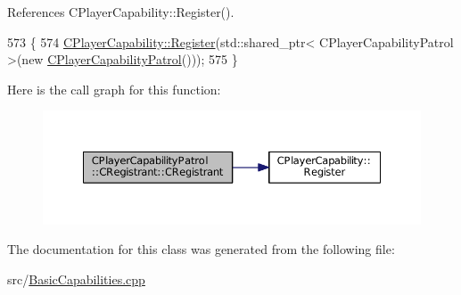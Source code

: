 References C\+Player\+Capability\+::\+Register().


\begin{DoxyCode}
573                                                \{
574     \hyperlink{classCPlayerCapability_a7e298018dcde2684451add3cfff065f7}{CPlayerCapability::Register}(std::shared\_ptr< CPlayerCapabilityPatrol >(\textcolor{keyword}{new} 
      \hyperlink{classCPlayerCapabilityPatrol_a9c8653e6b0509a753d0b084f3988953b}{CPlayerCapabilityPatrol}()));   
575 \}
\end{DoxyCode}
Here is the call graph for this function\+:\nopagebreak
\begin{figure}[H]
\begin{center}
\leavevmode
\includegraphics[width=350pt]{classCPlayerCapabilityPatrol_1_1CRegistrant_a30363f71e5aeed45f3953729b07829ac_cgraph}
\end{center}
\end{figure}


The documentation for this class was generated from the following file\+:\begin{DoxyCompactItemize}
\item 
src/\hyperlink{BasicCapabilities_8cpp}{Basic\+Capabilities.\+cpp}\end{DoxyCompactItemize}
